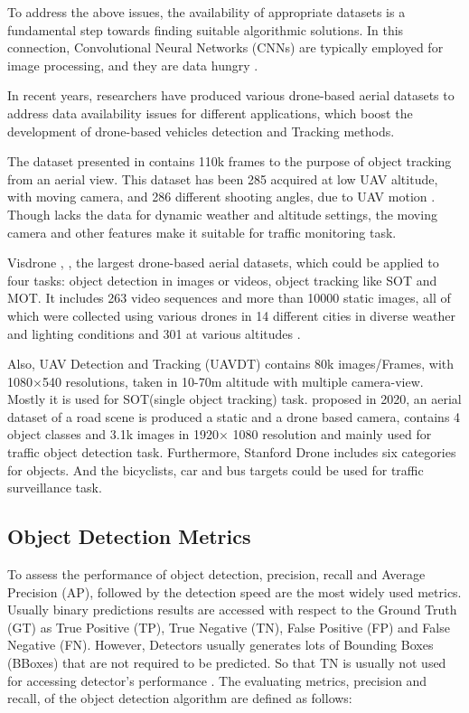 \documentclass[10pt,twocolumn,letterpaper]{article}  %
\begin{document}
To address the above issues, the availability of appropriate
datasets is a fundamental step towards finding suitable algorithmic solutions. In this connection, Convolutional Neural Networks (CNNs) are typically employed for image processing, and they are data hungry \cite{waqas2019isaid}.

In recent years, researchers have produced various drone-based aerial datasets to address data availability issues for different applications, which boost the development of drone-based vehicles detection and Tracking methods.\cite{bisio2022systematic}

The dataset presented in \cite{mueller2016benchmark} contains 110k frames to the purpose of object tracking from an aerial view. This dataset has been 285
acquired at low UAV altitude, with moving camera, and 286
different shooting angles, due to UAV motion \cite{bisio2022systematic}. Though \cite{mueller2016benchmark} lacks the data for dynamic weather and altitude settings, the moving camera and other features make it suitable for traffic monitoring task.

Visdrone \cite{zhu2021detection}, \cite{zhu2018vision}, the largest drone-based aerial datasets, which could be applied to four tasks: object detection in images or videos, object tracking like SOT and MOT. It includes 263 video sequences and more than 10000 static images, all of which were collected using various drones in 14 different cities in diverse weather and lighting conditions and 301
at various altitudes \cite{bisio2022systematic}.

Also, UAV Detection and Tracking (UAVDT) \cite{du2018unmanned} contains 80k images/Frames, with 1080$\times$540  resolutions, taken in 10-70m altitude with multiple camera-view. Mostly it is used for SOT(single object tracking) task. \cite{jensen2020presenting} proposed in 2020, an aerial dataset of a road scene is produced a static and a drone based camera, contains 4 object classes and 3.1k images in 1920$\times$ 1080 resolution and mainly used for traffic object detection task. Furthermore, Stanford Drone \cite{robicquet2016learning} includes six categories for objects. And the bicyclists, car and bus targets could be used for traffic surveillance task. 

\subsection{Object Detection Metrics}
To assess the performance of object detection, precision, recall and Average Precision (AP), followed by the detection speed are the most widely used metrics. Usually binary predictions results are accessed with respect to the Ground Truth (GT) as True Positive (TP), True Negative (TN), False Positive (FP) and False Negative (FN). However, Detectors usually generates lots of Bounding Boxes (BBoxes) that are not required to be predicted. So that TN is usually not used for accessing detector's performance \cite{padilla2020survey}.
The evaluating metrics, precision and recall, of the object detection algorithm are defined as follows:
\end{document}
